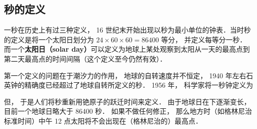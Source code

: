 
\subsection{秒的定义}
一秒在历史上有过三种定义， 16 世纪末开始出现以秒为最小单位的钟表．当时秒的定义是将一个太阳日划分为 $24\times60\times60 = 86400$ 等分， 并定义每等分一秒． 而一个\textbf{太阳日（solar day）}可以定义为地球上某处观察到太阳从一天的最高点到第二天最高点的时间间隔（这个定义至今仍然有效）．

第一个定义的问题在于潮汐力的作用， 地球的自转速度并不恒定， 1940 年左右石英钟的精确度已经超过了地球自转所定义的秒． 1956 年， 科学家将一秒钟定义为 

但， 于是人们将秒重新用铯原子的跃迁时间来定义． 由于地球日在下逐渐变长， 目前一个地球日略大于 86400 秒． 如果不做任何修正， 那么地方时（如格林尼治标准时间）中午 12 点太阳将不会出现在（格林尼治的）最高点．

